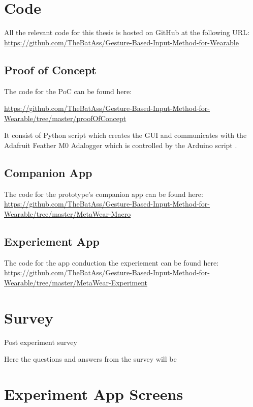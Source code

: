 \chapter{Code}
All the relevant code for this thesis is hosted on GitHub at the following URL:
\url{https://github.com/TheBatAss/Gesture-Based-Input-Method-for-Wearable}

\section{Proof of Concept}\label{poc_code}
The code for the PoC can be found here:

\url{https://github.com/TheBatAss/Gesture-Based-Input-Method-for-Wearable/tree/master/proofOfConcept}

It consist of Python script  which creates the GUI and communicates with the Adafruit Feather M0 Adalogger\cite{adalogger} which is controlled by the Arduino script .

\section{Companion App}\label{metawear_macro}
The code for the prototype's companion app  can be found here:
\url{https://github.com/TheBatAss/Gesture-Based-Input-Method-for-Wearable/tree/master/MetaWear-Macro}

\section{Experiement App}\label{metawear_experiment}
The code for the app  conduction the experiement can be found here:
\url{https://github.com/TheBatAss/Gesture-Based-Input-Method-for-Wearable/tree/master/MetaWear-Experiment}






























\chapter{Survey}\label{survey}
Post experiment survey

Here the questions and answers from the survey will be











\chapter{Experiment App Screens}\label{ex_app_screens}
